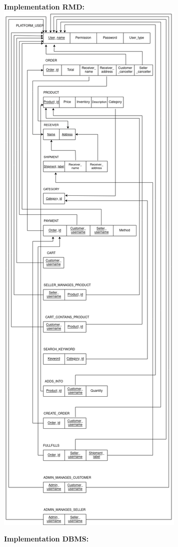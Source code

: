 \documentclass[12pt]{article}
\begin{document}
\newpage
\textbf{Implementation RMD:}
\includegraphics[height=.98\textheight]{Diagrams/relation.png}

\newpage
\textbf{Implementation DBMS:}
\end{document}
